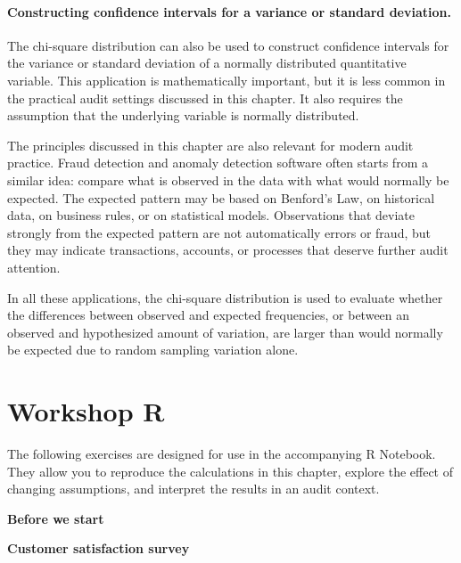 \paragraph{Constructing confidence intervals for a variance or standard deviation.} The chi-square distribution can also be used to construct confidence intervals for the variance or standard deviation of a normally distributed quantitative variable. This application is mathematically important, but it is less common in the practical audit settings discussed in this chapter. It also requires the assumption that the underlying variable is normally distributed.

\medskip
The principles discussed in this chapter are also relevant for modern audit practice. Fraud detection and anomaly detection software often starts from a similar idea: compare what is observed in the data with what would normally be expected. The expected pattern may be based on Benford's Law, on historical data, on business rules, or on statistical models. Observations that deviate strongly from the expected pattern are not automatically errors or fraud, but they may indicate transactions, accounts, or processes that deserve further audit attention.

In all these applications, the chi-square distribution is used to evaluate whether the differences between observed and expected frequencies, or between an observed and hypothesized amount of variation, are larger than would normally be expected due to random sampling variation alone.

\section{Workshop R}

The following exercises are designed for use in the accompanying R Notebook.
They allow you to reproduce the calculations in this chapter, explore the
effect of changing assumptions, and interpret the results in an audit context.

\begin{exercise}
\label{ex:gof_before_start}

\textbf{Before we start}



\end{exercise}

\begin{exercise}
\label{ex:customer_satisfaction_survey}

\textbf{Customer satisfaction survey}









\end{exercise}

